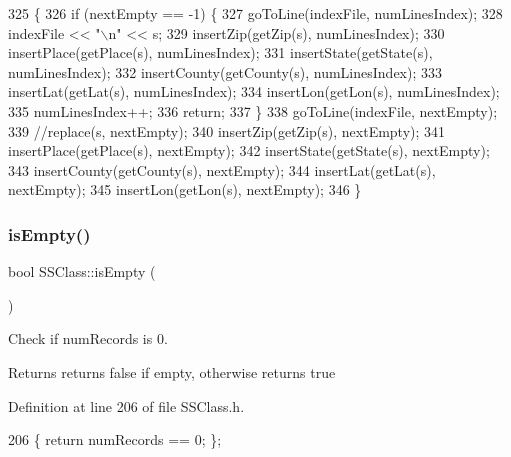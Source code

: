 \begin{DoxyCode}
325                              \{
326     \textcolor{keywordflow}{if} (nextEmpty == -1) \{
327         goToLine(indexFile, numLinesIndex);
328         indexFile << \textcolor{stringliteral}{"\(\backslash\)n"} << s;
329         insertZip(getZip(s), numLinesIndex);
330         insertPlace(getPlace(s), numLinesIndex);
331         insertState(getState(s), numLinesIndex);
332         insertCounty(getCounty(s), numLinesIndex);
333         insertLat(getLat(s), numLinesIndex);
334         insertLon(getLon(s), numLinesIndex);
335         numLinesIndex++;
336         \textcolor{keywordflow}{return};
337     \}
338     goToLine(indexFile, nextEmpty);
339     \textcolor{comment}{//replace(s, nextEmpty);}
340     insertZip(getZip(s), nextEmpty);
341     insertPlace(getPlace(s), nextEmpty);
342     insertState(getState(s), nextEmpty);
343     insertCounty(getCounty(s), nextEmpty);
344     insertLat(getLat(s), nextEmpty);
345     insertLon(getLon(s), nextEmpty);
346 \}
\end{DoxyCode}
\mbox{\label{classSSClass_afc95611385e4d389818332414d5c491c}} 
\subsubsection{\texorpdfstring{is\+Empty()}{isEmpty()}}
{\footnotesize\ttfamily bool S\+S\+Class\+::is\+Empty (\begin{DoxyParamCaption}{ }\end{DoxyParamCaption})\hspace{0.3cm}{\ttfamily [inline]}}



Check if num\+Records is 0. 

\begin{DoxyReturn}{Returns}
returns false if empty, otherwise returns true 
\end{DoxyReturn}


Definition at line 206 of file S\+S\+Class.\+h.


\begin{DoxyCode}
206 \{ \textcolor{keywordflow}{return} numRecords == 0; \};
\end{DoxyCode}
\mbox{\label{classSSClass_a92e012441608ea36f3013fb3cbea9da8}} 
